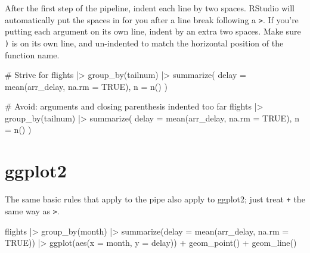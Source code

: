 \documentclass[
  letterpaper,
  DIV=11,
  numbers=noendperiod]{scrreprt}
\newenvironment{Shaded}{\begin{snugshade}}{\end{snugshade}}
\newcommand{\AttributeTok}[1]{\textcolor[rgb]{0.40,0.45,0.13}{#1}}
\newcommand{\CommentTok}[1]{\textcolor[rgb]{0.37,0.37,0.37}{#1}}
\newcommand{\ConstantTok}[1]{\textcolor[rgb]{0.56,0.35,0.01}{#1}}
\newcommand{\FunctionTok}[1]{\textcolor[rgb]{0.28,0.35,0.67}{#1}}
\newcommand{\NormalTok}[1]{\textcolor[rgb]{0.00,0.23,0.31}{#1}}
\newcommand{\SpecialCharTok}[1]{\textcolor[rgb]{0.37,0.37,0.37}{#1}}
\begin{document}
After the first step of the pipeline, indent each line by two spaces.
RStudio will automatically put the spaces in for you after a line break
following a \texttt{\textbar{}\textgreater{}}. If you're putting each
argument on its own line, indent by an extra two spaces. Make sure
\texttt{)} is on its own line, and un-indented to match the horizontal
position of the function name.

\begin{Shaded}
\begin{Highlighting}[]
\CommentTok{\# Strive for}
\NormalTok{flights }\SpecialCharTok{|\textgreater{}}
  \FunctionTok{group\_by}\NormalTok{(tailnum) }\SpecialCharTok{|\textgreater{}}
  \FunctionTok{summarize}\NormalTok{(}
    \AttributeTok{delay =} \FunctionTok{mean}\NormalTok{(arr\_delay, }\AttributeTok{na.rm =} \ConstantTok{TRUE}\NormalTok{),}
    \AttributeTok{n =} \FunctionTok{n}\NormalTok{()}
\NormalTok{  )}

\CommentTok{\# Avoid: arguments and closing parenthesis indented too far}
\NormalTok{flights }\SpecialCharTok{|\textgreater{}}
  \FunctionTok{group\_by}\NormalTok{(tailnum) }\SpecialCharTok{|\textgreater{}}
  \FunctionTok{summarize}\NormalTok{(}
      \AttributeTok{delay =} \FunctionTok{mean}\NormalTok{(arr\_delay, }\AttributeTok{na.rm =} \ConstantTok{TRUE}\NormalTok{),}
      \AttributeTok{n =} \FunctionTok{n}\NormalTok{()}
\NormalTok{    )}
\end{Highlighting}
\end{Shaded}

\section{ggplot2}\label{ggplot2}

The same basic rules that apply to the pipe also apply to ggplot2; just
treat \texttt{+} the same way as \texttt{\textbar{}\textgreater{}}.

\begin{Shaded}
\begin{Highlighting}[]
\NormalTok{flights }\SpecialCharTok{|\textgreater{}}
  \FunctionTok{group\_by}\NormalTok{(month) }\SpecialCharTok{|\textgreater{}}
  \FunctionTok{summarize}\NormalTok{(}\AttributeTok{delay =} \FunctionTok{mean}\NormalTok{(arr\_delay, }\AttributeTok{na.rm =} \ConstantTok{TRUE}\NormalTok{)) }\SpecialCharTok{|\textgreater{}}
  \FunctionTok{ggplot}\NormalTok{(}\FunctionTok{aes}\NormalTok{(}\AttributeTok{x =}\NormalTok{ month, }\AttributeTok{y =}\NormalTok{ delay)) }\SpecialCharTok{+}
  \FunctionTok{geom\_point}\NormalTok{() }\SpecialCharTok{+}
  \FunctionTok{geom\_line}\NormalTok{()}
\end{Highlighting}
\end{Shaded}
\end{document}
